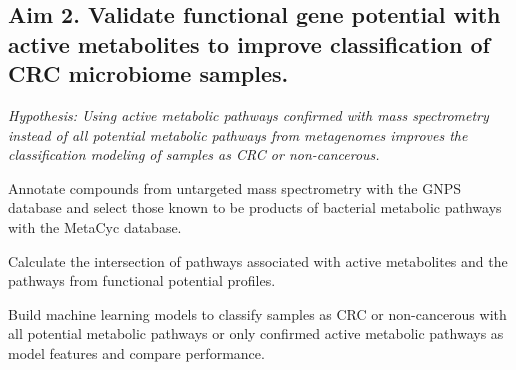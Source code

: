 \documentclass[12pt]{article}
\begin{document}
\subsection*{Aim 2. Validate functional gene potential with active metabolites to improve classification of CRC microbiome samples.}
\textit{Hypothesis: Using active metabolic pathways confirmed with mass spectrometry instead of all potential metabolic pathways from metagenomes improves the classification modeling of samples as CRC or non-cancerous.}
\begin{compactenum}[A.]
    \item Annotate compounds from untargeted mass spectrometry with the GNPS database and select those known to be products of bacterial metabolic pathways with the MetaCyc database.
    \item Calculate the intersection of pathways associated with active metabolites and the pathways from functional potential profiles.
    \item Build machine learning models to classify samples as CRC or non-cancerous with all potential metabolic pathways or only confirmed active metabolic pathways as model features and compare performance.
\end{compactenum}


\pagebreak

\section*{\refname}
\footnotesize{

\par}
\end{document}
